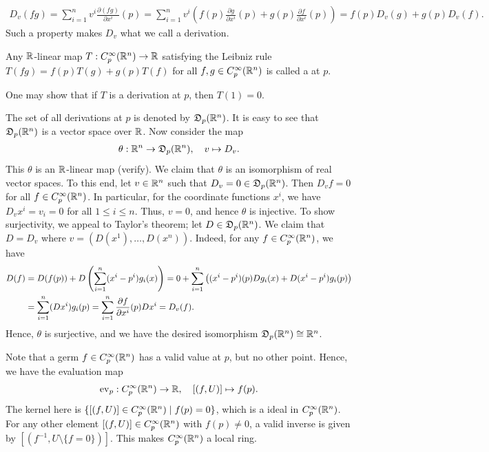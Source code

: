 \begin{align}
    D_{v}(fg) = \sum_{i=1}^{n} v^{i} \frac{\partial (fg)}{\partial x^{i}}(p) = \sum_{i=1}^{n} v^{i} \left( f(p) \frac{\partial g}{\partial x^{i}}(p) + g(p) \frac{\partial f}{\partial x^{i}}(p) \right) = f(p) D_{v}(g) + g(p) D_{v}(f).
\end{align} 
Such a property makes $D_{v}$ what we call a derivation.
\begin{definition}
    Any $\mathbb{R}$-linear map $T:C^{\infty}_{p}(\mathbb{R}^{n}) \to \mathbb{R}$ satisfying the Leibniz rule $T(fg) = f(p)T(g) + g(p)T(f)$ for all $f,g \in C^{\infty}_{p}(\mathbb{R}^{n})$ is called a  at $p$.
\end{definition}
One may show that if $T$ is a derivation at $p$, then $T(1) = 0$. 

The set of all derivations at $p$ is denoted by $\mathfrak{D}_{p}(\mathbb{R}^{n})$. It is easy to see that $\mathfrak{D}_{p}(\mathbb{R}^{n})$ is a vector space over $\mathbb{R}$. Now consider the map
\begin{align}
    \theta:\mathbb{R}^{n} \to \mathfrak{D}_{p}(\mathbb{R}^{n}), \quad v \mapsto D_{v}.
\end{align}
This $\theta$ is an $\mathbb{R}$-linear map (verify). We claim that $\theta$ is an isomorphism of real vector spaces. To this end, let $v \in \mathbb{R}^{n}$ such that $D_{v} = 0 \in \mathfrak{D}_{p}(\mathbb{R}^{n})$. Then $D_{v}f = 0$ for all $f \in C^{\infty}_{p}(\mathbb{R}^{n})$. In particular, for the coordinate functions $x^{i}$, we have $D_{v}x^{i} = v_{i} = 0$ for all $1 \leq i \leq n$. Thus, $v = 0$, and hence $\theta$ is injective. To show surjectivity, we appeal to Taylor's theorem; let $D \in \mathfrak{D}_{p}(\mathbb{R}^{n})$. We claim that $D = D_{v}$ where $v = (D(x^{1}),\ldots,D(x^{n}))$. Indeed, for any $f \in C^{\infty}_{p}(\mathbb{R}^{n})$, we have
\begin{align}
    D(f) &= D(f(p)) + D\left( \sum_{i=1}^{n} (x^{i}-p^{i}) g_{i}(x) \right) = 0 + \sum_{i=1}^{n} \left( (x^{i}-p^{i})(p) Dg_{i}(x) + D(x^{i}-p^{i})g_{i}(p) \right) \notag \\
    &= \sum_{i=1}^{n} (Dx^{i})g_{i}(p) = \sum_{i=1}^{n} \frac{\partial f}{\partial x^{i}}(p) Dx^{i} = D_{v}(f).
\end{align}
Hence, $\theta$ is surjective, and we have the desired isomorphism $\mathfrak{D}_{p}(\mathbb{R}^{n}) \cong \mathbb{R}^{n}$.

Note that a germ $f \in C^{\infty}_{p}(\mathbb{R}^{n})$ has a valid value at $p$, but no other point. Hence, we have the evaluation map 
\begin{align}
    \operatorname{ev}_p: C^{\infty}_{p}(\mathbb{R}^{n}) \to \mathbb{R}, \quad [(f,U)] \mapsto f(p).
\end{align}
The kernel here is $\{[(f,U)] \in C^{\infty}_{p}(\mathbb{R}^{n}) \mid f(p) = 0\}$, which is a ideal in $C^{\infty}_{p}(\mathbb{R}^{n})$. For any other element $[(f,U)] \in C^{\infty}_{p}(\mathbb{R}^{n})$ with $f(p) \neq 0$, a valid inverse is given by $[(f^{-1},U\setminus\{f=0\})]$. This makes $C^{\infty}_{p}(\mathbb{R}^{n})$ a local ring.
\\

